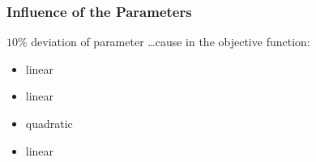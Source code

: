 \documentclass{beamer}
\begin{document}
\begin{frame}
	\frametitle{Influence of the Parameters}
	$10\%$ deviation of parameter \dots cause in the objective function:
	\begin{itemize}
		\item{     \makebox[1cm]{}linear}
		\item{           \makebox[1cm]{}linear}
		\item{        \makebox[1cm]{}quadratic}
		\item{              \makebox[1cm]{}linear}
	\end{itemize}
	

\end{frame}
\end{document}

